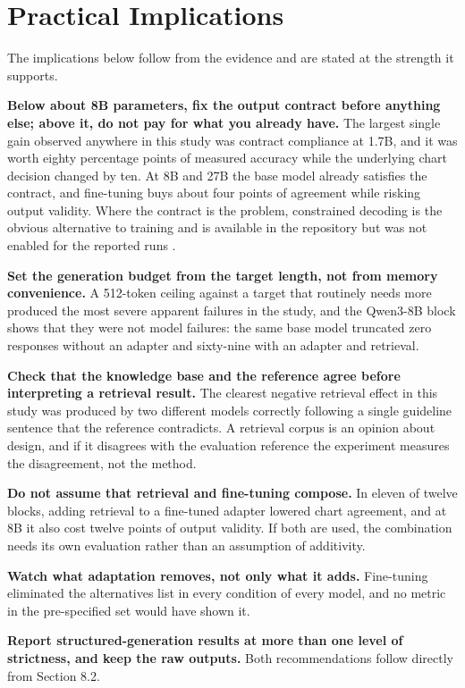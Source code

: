 \section{Practical Implications}

The implications below follow from the evidence and are stated at the strength it supports.

\textbf{Below about 8B parameters, fix the output contract before anything else; above it, do not pay for what you already have.} The largest single gain observed anywhere in this study was contract compliance at 1.7B, and it was worth eighty percentage points of measured accuracy while the underlying chart decision changed by ten. At 8B and 27B the base model already satisfies the contract, and fine-tuning buys about four points of agreement while risking output validity. Where the contract is the problem, constrained decoding is the obvious alternative to training and is available in the repository but was not enabled for the reported runs \cite{willard2023guided,geng2025structured}.

\textbf{Set the generation budget from the target length, not from memory convenience.} A 512-token ceiling against a target that routinely needs more produced the most severe apparent failures in the study, and the Qwen3-8B block shows that they were not model failures: the same base model truncated zero responses without an adapter and sixty-nine with an adapter and retrieval.

\textbf{Check that the knowledge base and the reference agree before interpreting a retrieval result.} The clearest negative retrieval effect in this study was produced by two different models correctly following a single guideline sentence that the reference contradicts. A retrieval corpus is an opinion about design, and if it disagrees with the evaluation reference the experiment measures the disagreement, not the method.

\textbf{Do not assume that retrieval and fine-tuning compose.} In eleven of twelve blocks, adding retrieval to a fine-tuned adapter lowered chart agreement, and at 8B it also cost twelve points of output validity. If both are used, the combination needs its own evaluation rather than an assumption of additivity.

\textbf{Watch what adaptation removes, not only what it adds.} Fine-tuning eliminated the alternatives list in every condition of every model, and no metric in the pre-specified set would have shown it.

\textbf{Report structured-generation results at more than one level of strictness, and keep the raw outputs.} Both recommendations follow directly from Section 8.2.

